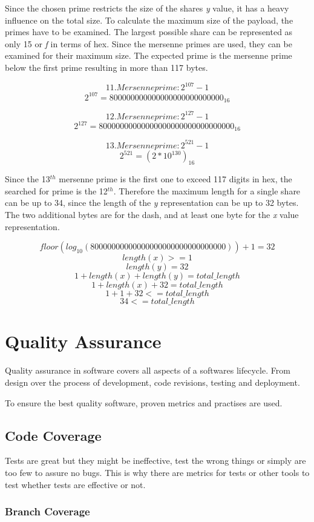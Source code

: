 Since the chosen prime restricts the size of the shares \textit{y} value, it
has a heavy influence on the total size. To calculate the maximum size of the
payload, the primes have to be examined. The largest possible share can be
represented as only 15 or \textit{f} in terms of hex. Since the mersenne primes
are used, they can be examined for their maximum size. The expected prime is
the mersenne prime below the first prime resulting in more than 117 bytes.

$$11. Mersenne prime: 2^{107}-1$$
$$2^{107} = 800000000000000000000000000_{16}$$

$$12. Mersenne prime: 2^{127}-1$$
$$2^{127} = 80000000000000000000000000000000_{16}$$

$$13. Mersenne prime: 2^{521}-1$$
$$2^{521} = (2*10^{130})_{16}$$

Since the 13$^{th}$ mersenne prime is the first one to exceed 117 digits in
hex, the searched for prime is the 12$^{th}$. Therefore the maximum length for
a single share can be up to 34, since the length of the \textit{y}
representation can be up to 32 bytes. The two additional bytes are for the
dash, and at least one byte for the \textit{x} value representation.

$$floor(log_{10}(80000000000000000000000000000000)) + 1 = 32$$
$$length(x) >= 1$$
$$length(y) = 32$$
$$1 + length(x) + length(y) = total\_length$$
$$1 + length(x) + 32 = total\_length$$
$$1 + 1 + 32 <= total\_length$$
$$34 <= total\_length$$

\chapter{Quality Assurance}

Quality assurance in software covers all aspects of a softwares lifecycle.
From design over the process of development, code revisions, testing and
deployment.

To ensure the best quality software, proven metrics and practises are used.

\section{Code Coverage}

Tests are great but they might be ineffective, test the wrong things
or simply are too few to assure no bugs. This is why there are metrics
for tests or other tools to test whether tests are effective or not.

\subsection{Branch Coverage}


